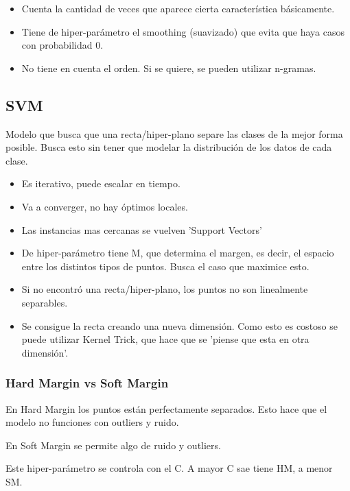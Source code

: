 \documentclass[titlepage,a4paper]{article}
\begin{document}
\begin{itemize}
    \item Cuenta la cantidad de veces que aparece cierta característica básicamente.
    \item Tiene de hiper-parámetro el smoothing (suavizado) que evita que haya casos con probabilidad 0.
    \item No tiene en cuenta el orden. Si se quiere, se pueden utilizar n-gramas.
    
\end{itemize}


\subsection{SVM}

Modelo que busca que una recta/hiper-plano separe las clases de la mejor forma posible. Busca esto sin tener que modelar la distribución de los datos de cada clase.

\begin{itemize}
    \item Es iterativo, puede escalar en tiempo.
    \item Va a converger, no hay óptimos locales.
    \item Las instancias mas cercanas se vuelven 'Support Vectors'
    \item De hiper-parámetro tiene M, que determina el margen, es decir, el espacio entre los distintos tipos de puntos. Busca el caso que maximice esto.
    \item Si no encontró una recta/hiper-plano, los puntos no son linealmente separables.
    \item Se consigue la recta creando una nueva dimensión. Como esto es costoso se puede utilizar Kernel Trick, que hace que se 'piense que esta en otra dimensión'.
\end{itemize}

\subsubsection*{Hard Margin vs Soft Margin}

En Hard Margin los puntos están perfectamente separados. Esto hace que el modelo no funciones con outliers y ruido.

En Soft Margin se permite algo de ruido y outliers.

Este hiper-parámetro se controla con el C. A mayor C sae tiene HM, a menor SM.
\end{document}

